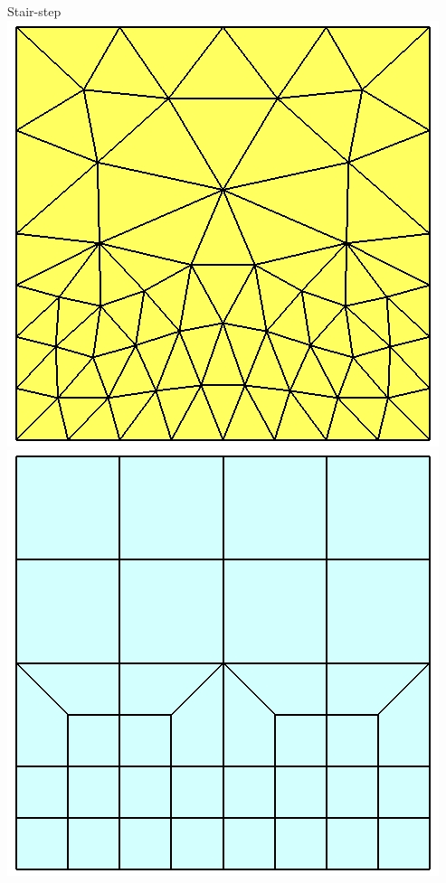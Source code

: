 \documentclass[pdftex,cig,slideColor]{pp4slides}
\begin{document}
  
  \summary{}

  \begin{minipage}{4in}
    \begin{center}
      Stair-step\\
      \includegraphics[scale=0.4]{figs/tri3_step}\\
      \includegraphics[scale=0.4]{figs/quad4_step}
    \end{center}
  \end{minipage}
\end{document}
